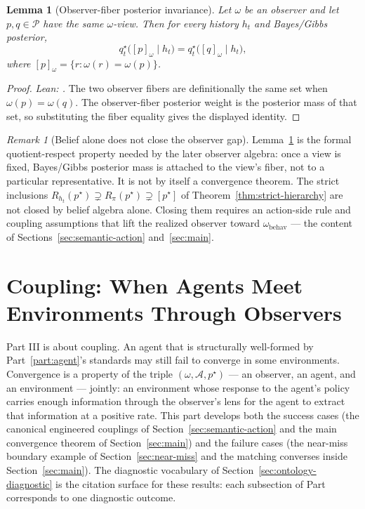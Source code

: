 \documentclass[11pt]{article}
\newtheorem{lemma}[theorem]{Lemma}
\theoremstyle{definition}
\theoremstyle{remark}
\newtheorem{remark}[theorem]{Remark}
\theoremstyle{plain}
\theoremstyle{definition}
\newcommand{\Acal}{\mathcal{A}}
\newcommand{\Pcal}{\mathcal{P}}
\begin{document}
\begin{lemma}[Observer-fiber posterior invariance]
\label{lem:merging}
Let $\omega$ be an observer and let $p,q\in\Pcal$ have the same $\omega$-view. Then for every history $h_t$ and Bayes/Gibbs posterior,
\[
q_t^\star\bigl([p]_\omega\mid h_t\bigr)
=
q_t^\star\bigl([q]_\omega\mid h_t\bigr),
\]
where $[p]_\omega=\{r:\omega(r)=\omega(p)\}$.
\end{lemma}

\begin{proof}
\noindent\emph{Lean: .}
The two observer fibers are definitionally the same set when $\omega(p)=\omega(q)$. The observer-fiber posterior weight is the posterior mass of that set, so substituting the fiber equality gives the displayed identity.
\end{proof}

\begin{remark}[Belief alone does not close the observer gap]
\label{rem:belief-reaches-Rht}
Lemma~\ref{lem:merging} is the formal quotient-respect property needed by the later observer algebra: once a view is fixed, Bayes/Gibbs posterior mass is attached to the view's fiber, not to a particular representative. It is not by itself a convergence theorem. The strict inclusions $R_{h_t}(p^\star)\supsetneq R_\pi(p^\star)\supsetneq[p^\star]$ of Theorem~\ref{thm:strict-hierarchy} are not closed by belief algebra alone. Closing them requires an action-side rule and coupling assumptions that lift the realized observer toward $\omega_{\mathrm{behav}}$ --- the content of Sections~\ref{sec:semantic-action} and~\ref{sec:main}.
\end{remark}


\part{Coupling: When Agents Meet Environments Through Observers}
\label{part:coupling}

Part III is about coupling. An agent that is structurally well-formed by Part~\ref{part:agent}'s standards may still fail to converge in some environments. Convergence is a property of the triple $(\omega,\Acal,p^\star)$ --- an observer, an agent, and an environment --- jointly: an environment whose response to the agent's policy carries enough information through the observer's lens for the agent to extract that information at a positive rate. This part develops both the success cases (the canonical engineered couplings of Section~\ref{sec:semantic-action} and the main convergence theorem of Section~\ref{sec:main}) and the failure cases (the near-miss boundary example of Section~\ref{sec:near-miss} and the matching converses inside Section~\ref{sec:main}). The diagnostic vocabulary of Section~\ref{sec:ontology-diagnostic} is the citation surface for these results: each subsection of Part~\ref{part:coupling} corresponds to one diagnostic outcome.
\end{document}
